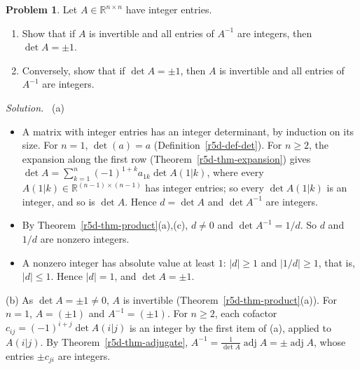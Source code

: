 \documentclass[12pt]{article}
\newcommand{\R}{\mathbb R}
\theoremstyle{definition}
\newtheorem{problem}{Problem}
\newenvironment{solution}{\par\noindent\textit{Solution.}\ }{\par\smallskip}
\begin{document}
\begin{problem}\label{r5d-ex-integer}
Let \(A\in\R^{n\times n}\) have integer entries.
\begin{enumerate}
\item Show that if \(A\) is invertible and all entries of \(A^{-1}\) are integers, then \(\det A=\pm1\).
\item Conversely, show that if \(\det A=\pm1\), then \(A\) is invertible and all entries of \(A^{-1}\) are integers.
\end{enumerate}
\end{problem}
\begin{solution}
(a)
\begin{itemize}
\item A matrix with integer entries has an integer determinant, by induction on its size. For \(n=1\),
\(\det(a)=a\) (Definition~\ref{r5d-def-det}). For \(n\geqslant2\), the expansion along the first row
(Theorem~\ref{r5d-thm-expansion}) gives \(\det A=\sum_{k=1}^n(-1)^{1+k}a_{1k}\det A(1|k)\), where every
\(A(1|k)\in\R^{(n-1)\times(n-1)}\) has integer entries; so every \(\det A(1|k)\) is an integer, and so is \(\det A\).
Hence \(d=\det A\) and \(\det A^{-1}\) are integers.
\item By Theorem~\ref{r5d-thm-product}(a),(c), \(d\ne0\) and \(\det A^{-1}=1/d\). So \(d\) and \(1/d\) are nonzero
integers.
\item A nonzero integer has absolute value at least \(1\): \(\lvert d\rvert\geqslant1\) and \(\lvert1/d\rvert\geqslant1\), that
is, \(\lvert d\rvert\leqslant1\). Hence \(\lvert d\rvert=1\), and \(\det A=\pm1\).
\end{itemize}
(b) As \(\det A=\pm1\ne0\), \(A\) is invertible (Theorem~\ref{r5d-thm-product}(a)). For \(n=1\), \(A=(\pm1)\) and
\(A^{-1}=(\pm1)\). For \(n\geqslant2\), each cofactor \(c_{ij}=(-1)^{i+j}\det A(i|j)\) is an integer by the first item
of (a), applied to \(A(i|j)\). By Theorem~\ref{r5d-thm-adjugate},
\(A^{-1}=\frac1{\det A}\operatorname{adj}A=\pm\operatorname{adj}A\), whose entries \(\pm c_{ji}\) are integers.
\end{solution}
\end{document}
